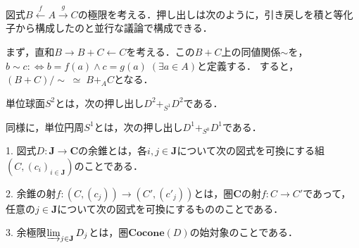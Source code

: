 \documentclass[uplatex, dvipdfmx]{jsarticle}
\begin{document}
\begin{example*}[Setsでの押し出し]
    図式$B\xleftarrow{f}A\xrightarrow{g}C$の極限を考える．押し出しは次のように，引き戻しを積と等化子から構成したのと並行な議論で構成できる．

    まず，直和$B\rightarrow B+C \leftarrow C$を考える．この$B+ C$上の同値関係$\sim$を，$b\sim c:\Leftrightarrow b=f(a)\land c=g(a)\;(\exists a\in A)$と定義する．
    すると，$(B+C)/\sim\;\simeq\; B+_AC$となる．
\end{example*}
\begin{example}[Topでの押し出し]
    単位球面$S^2$とは，次の押し出し$D^2+_{S^1}D^2$である．
    \begin{center}
    \end{center}
    同様に，単位円周$S^1$とは，次の押し出し$D^1+_{S^0}D^1$である．
    \begin{center}
    \end{center}
\end{example}

\begin{definition*}[Colimits]
    1. 図式$D:\mathbf{J}\to \mathbf{C}$の余錐とは，各$i,j\in\mathbf{J}$について次の図式を可換にする組$(C,(c_i)_{i\in\mathbf{J}})$のことである．
    \begin{center}
    \end{center}
    
    2. 余錐の射$f:(C,(c_j))\to (C',(c'_j))$とは，圏$\mathbf{C}$の射$f:C\to C'$であって，任意の$j\in\mathbf{J}$について次の図式を可換にするもののことである．
    \begin{center}
    \end{center}

    3. 余極限$\varinjlim_{j\in\mathbf{J}}D_j$とは，圏$\mathbf{Cocone}(D)$の始対象のことである．
\end{definition*}
\end{document}
